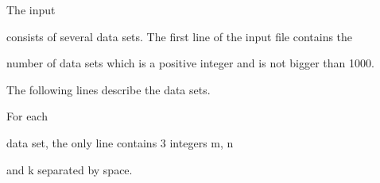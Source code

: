The input 

  consists of several data sets. The first line of the input file contains the 

  number of data sets which is a positive integer and is not bigger than 1000. 

  The following lines describe the data sets. 



  For each 

  data set, the only line contains 3 integers m, n 

  and k separated by space.